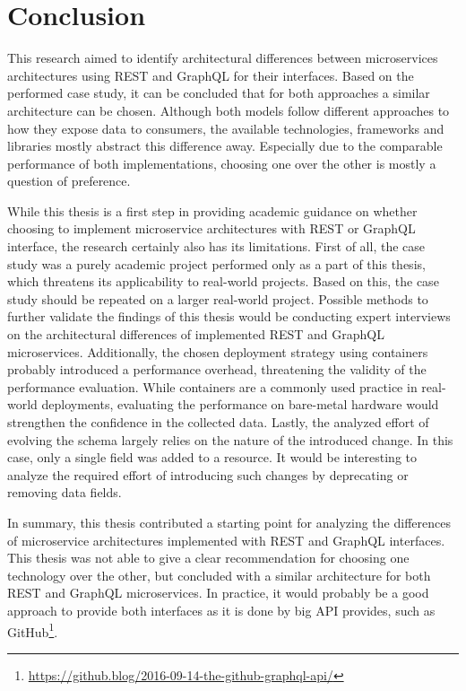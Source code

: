 \section{Conclusion}\label{sec:conclusion}

This research aimed to identify architectural differences between microservices architectures using \ac{REST} and GraphQL for their interfaces.
Based on the performed case study, it can be concluded that for both approaches a similar architecture can be chosen.
Although both models follow different approaches to how they expose data to consumers, the available technologies, frameworks and libraries mostly abstract this difference away.
Especially due to the comparable performance of both implementations, choosing one over the other is mostly a question of preference.

While this thesis is a first step in providing academic guidance on whether choosing to implement microservice architectures with \ac{REST} or GraphQL interface, the research certainly also has its limitations.
First of all, the case study was a purely academic project performed only as a part of this thesis, which threatens its applicability to real-world projects.
Based on this, the case study should be repeated on a larger real-world project.
Possible methods to further validate the findings of this thesis would be conducting expert interviews on the architectural differences of implemented \ac{REST} and GraphQL microservices.
Additionally, the chosen deployment strategy using containers probably introduced a performance overhead, threatening the validity of the performance evaluation.
While containers are a commonly used practice in real-world deployments, evaluating the performance on bare-metal hardware would strengthen the confidence in the collected data.
Lastly, the analyzed effort of evolving the schema largely relies on the nature of the introduced change.
In this case, only a single field was added to a resource.
It would be interesting to analyze the required effort of introducing such changes by deprecating or removing data fields.

In summary, this thesis contributed a starting point for analyzing the differences of microservice architectures implemented with \ac{REST} and GraphQL interfaces.
This thesis was not able to give a clear recommendation for choosing one technology over the other, but concluded with a similar architecture for both \ac{REST} and GraphQL microservices.
In practice, it would probably be a good approach to provide both interfaces as it is done by big \ac{API} provides, such as GitHub\footnote{\url{https://github.blog/2016-09-14-the-github-graphql-api/}}.


